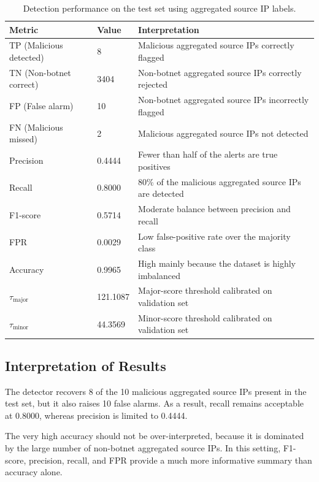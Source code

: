 \documentclass{article}
\begin{document}
\begin{table}[h]
\centering
\begin{tabular}{llp{7cm}}
\toprule
\textbf{Metric} & \textbf{Value} & \textbf{Interpretation} \\
\midrule
TP (Malicious detected) & 8    & Malicious aggregated source IPs correctly flagged \\
TN (Non-botnet correct) & 3404 & Non-botnet aggregated source IPs correctly rejected \\
FP (False alarm)        & 10   & Non-botnet aggregated source IPs incorrectly flagged \\
FN (Malicious missed)   & 2    & Malicious aggregated source IPs not detected \\
\midrule
Precision & 0.4444 & Fewer than half of the alerts are true positives \\
Recall    & 0.8000 & 80\% of the malicious aggregated source IPs are detected \\
F1-score  & 0.5714 & Moderate balance between precision and recall \\
FPR       & 0.0029 & Low false-positive rate over the majority class \\
Accuracy  & 0.9965 & High mainly because the dataset is highly imbalanced \\
$\tau_{\text{major}}$ & 121.1087 & Major-score threshold calibrated on validation set \\
$\tau_{\text{minor}}$ & 44.3569  & Minor-score threshold calibrated on validation set \\
\bottomrule
\end{tabular}
\caption{Detection performance on the test set using aggregated source IP labels.}
\label{tab:metrics}
\end{table}

\subsection{Interpretation of Results}

The detector recovers 8 of the 10 malicious aggregated source IPs present in the test set, but it also raises 10 false alarms. As a result, recall remains acceptable at 0.8000, whereas precision is limited to 0.4444.

The very high accuracy should not be over-interpreted, because it is dominated by the large number of non-botnet aggregated source IPs. In this setting, F1-score, precision, recall, and FPR provide a much more informative summary than accuracy alone.
\end{document}
